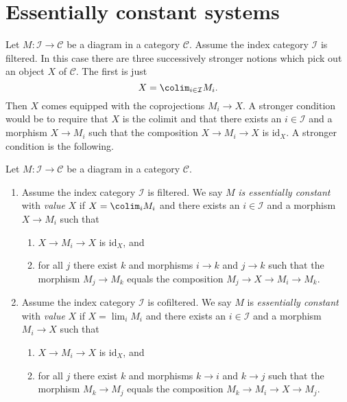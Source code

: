 \section{Essentially constant systems}
\label{section-essentially-constant}

\noindent
Let $M : \mathcal{I} \to \mathcal{C}$ be a diagram in a category $\mathcal{C}$.
Assume the index category $\mathcal{I}$ is filtered. In this case
there are three successively stronger notions which pick out an object
$X$ of $\mathcal{C}$. The first is just
$$
X = \colim_{i \in \mathcal{I}} M_i.
$$
Then $X$ comes equipped with the coprojections $M_i \to X$.
A stronger condition would be to require that $X$ is the colimit and
that there exists an $i \in \mathcal{I}$ and a morphism $X \to M_i$ such
that the composition $X \to M_i \to X$ is $\text{id}_X$. A stronger condition
is the following.

\begin{definition}
\label{definition-essentially-constant-diagram}
Let $M : \mathcal{I} \to \mathcal{C}$ be a diagram in a category
$\mathcal{C}$.
\begin{enumerate}
\item Assume the index category $\mathcal{I}$ is filtered.
We say $M$ {\it is essentially constant} with {\it value} $X$ if
$X = \colim_i M_i$ and there exists an $i \in \mathcal{I}$
and a morphism $X \to M_i$ such that
\begin{enumerate}
\item $X \to M_i \to X$ is $\text{id}_X$, and
\item for all $j$ there exist $k$ and morphisms $i \to k$ and $j \to k$
such that the morphism $M_j \to M_k$ equals the composition
$M_j \to X \to M_i \to M_k$.
\end{enumerate}
\item Assume the index category $\mathcal{I}$ is cofiltered. We say
$M$ is {\it essentially constant} with {\it value} $X$ if
$X = \lim_i M_i$ and there exists an $i \in \mathcal{I}$
and a morphism $M_i \to X$ such that
\begin{enumerate}
\item $X \to M_i \to X$ is $\text{id}_X$, and
\item for all $j$ there exist $k$ and morphisms $k \to i$ and $k \to j$
such that the morphism $M_k \to M_j$ equals the composition
$M_k \to M_i \to X \to M_j$.
\end{enumerate}
\end{enumerate}
\end{definition}

